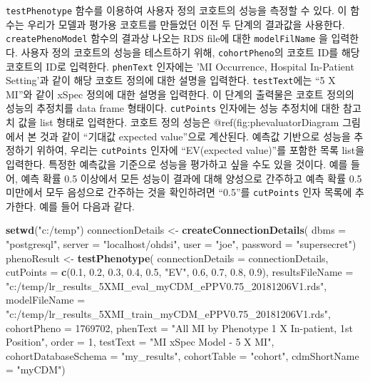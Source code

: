 \documentclass[10.5pt]{book}
\newenvironment{Shaded}{\begin{snugshade}}{\end{snugshade}}
\newcommand{\KeywordTok}[1]{\textcolor[rgb]{0.13,0.29,0.53}{\textbf{#1}}}
\newcommand{\DataTypeTok}[1]{\textcolor[rgb]{0.13,0.29,0.53}{#1}}
\newcommand{\DecValTok}[1]{\textcolor[rgb]{0.00,0.00,0.81}{#1}}
\newcommand{\FloatTok}[1]{\textcolor[rgb]{0.00,0.00,0.81}{#1}}
\newcommand{\StringTok}[1]{\textcolor[rgb]{0.31,0.60,0.02}{#1}}
\newcommand{\NormalTok}[1]{#1}
\theoremstyle{definition}
\theoremstyle{definition}
\theoremstyle{definition}
\theoremstyle{remark}
\begin{document}
\texttt{testPhenotype} 함수를 이용하여 사용자 정의 코호트의 성능을
측정할 수 있다. 이 함수는 우리가 모델과 평가용 코호트를 만들었던 이전 두
단계의 결과값을 사용한다. \texttt{createPhenoModel} 함수의 결과상 나오는
RDS file에 대한 \texttt{modelFilName} 을 입력한다. 사용자 정의 코호트의
성능을 테스트하기 위해, \texttt{cohortPheno}의 코호트 ID를 해당 코호트의
ID로 입력한다. \texttt{phenText} 인자에는 'MI Occurrence, Hospital
In-Patient Setting'과 같이 해당 코호트 정의에 대한 설명을 입력한다.
\texttt{testText}에는 ``5 X MI''와 같이 xSpec 정의에 대한 설명을
입력한다. 이 단계의 출력물은 코호트 정의의 성능의 추정치를 data frame
형태이다. \texttt{cutPoints} 인자에는 성능 추정치에 대한 참고치 값을
list 형태로 입력한다. 코호트 정의 성능은 @ref(fig:phevaluatorDiagram
그림에서 본 것과 같이 ``기대값 expected value''으로 계산된다. 예측값
기반으로 성능을 추정하기 위하여, 우리는 \texttt{cutPoints} 인자에
``EV(expected value)''를 포함한 목록 list을 입력한다. 특정한 예측값을
기준으로 성능을 평가하고 싶을 수도 있을 것이다. 예를 들어, 예측 확률 0.5
이상에서 모든 성능이 결과에 대해 양성으로 간주하고 예측 확률 0.5
미만에서 모두 음성으로 간주하는 것을 확인하려면 ``0.5''를
\texttt{cutPoints} 인자 목록에 추가한다. 예를 들어 다음과 같다.

\begin{Shaded}
\begin{Highlighting}[]
\KeywordTok{setwd}\NormalTok{(}\StringTok{"c:/temp"}\NormalTok{)}
\NormalTok{connectionDetails <-}\StringTok{ }\KeywordTok{createConnectionDetails}\NormalTok{(}
  \DataTypeTok{dbms =} \StringTok{"postgresql"}\NormalTok{,}
  \DataTypeTok{server =} \StringTok{"localhost/ohdsi"}\NormalTok{,}
  \DataTypeTok{user =} \StringTok{"joe"}\NormalTok{,}
  \DataTypeTok{password =} \StringTok{"supersecret"}\NormalTok{)}
\NormalTok{phenoResult <-}\StringTok{ }\KeywordTok{testPhenotype}\NormalTok{(}
  \DataTypeTok{connectionDetails =}\NormalTok{ connectionDetails,}
  \DataTypeTok{cutPoints =} \KeywordTok{c}\NormalTok{(}\FloatTok{0.1}\NormalTok{, }\FloatTok{0.2}\NormalTok{, }\FloatTok{0.3}\NormalTok{, }\FloatTok{0.4}\NormalTok{, }\FloatTok{0.5}\NormalTok{, }\StringTok{"EV"}\NormalTok{, }\FloatTok{0.6}\NormalTok{, }\FloatTok{0.7}\NormalTok{, }\FloatTok{0.8}\NormalTok{, }\FloatTok{0.9}\NormalTok{),}
  \DataTypeTok{resultsFileName =}
    \StringTok{"c:/temp/lr_results_5XMI_eval_myCDM_ePPV0.75_20181206V1.rds"}\NormalTok{,}
  \DataTypeTok{modelFileName =}
    \StringTok{"c:/temp/lr_results_5XMI_train_myCDM_ePPV0.75_20181206V1.rds"}\NormalTok{,}
  \DataTypeTok{cohortPheno =} \DecValTok{1769702}\NormalTok{,}
  \DataTypeTok{phenText =} \StringTok{"All MI by Phenotype 1 X In-patient, 1st Position"}\NormalTok{,}
  \DataTypeTok{order =} \DecValTok{1}\NormalTok{,}
  \DataTypeTok{testText =} \StringTok{"MI xSpec Model - 5 X MI"}\NormalTok{,}
  \DataTypeTok{cohortDatabaseSchema =} \StringTok{"my_results"}\NormalTok{,}
  \DataTypeTok{cohortTable =} \StringTok{"cohort"}\NormalTok{,}
  \DataTypeTok{cdmShortName =} \StringTok{"myCDM"}\NormalTok{)}
\end{Highlighting}
\end{Shaded}
\end{document}
